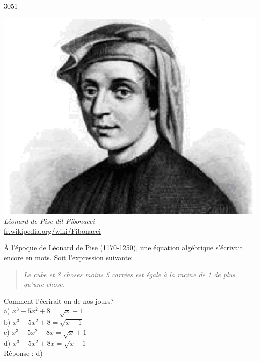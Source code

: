 \documentclass[letterpaper, 12pt]{article}
\begin{document}
3051--
\begin{center}
\includegraphics[scale=0.4]{Fibonacci.eps}\\
\emph{{\small L\'eonard de Pise {\scriptsize dit} Fibonacci}}\\
\href{http://fr.wikipedia.org/wiki/Fibonacci}{fr.wikipedia.org/wiki/Fibonacci}\\
\end{center}

\`A l'\'epoque de L\'eonard de Pise (1170-1250), une \'equation alg\'ebrique s'\'ecrivait encore en mots. Soit l'expression suivante:\\
\begin{quote}
\og \emph{Le cube et 8 choses moins 5 carr\'ees est \'egale \`a la racine de 1 de plus qu'une chose.} \fg\\
\end{quote}
Comment l'\'ecrirait-on de nos jours?\\

a) $x^{3} - 5x^{2} + 8 = \sqrt{x} + 1$\\[2mm]
b) $x^{3} - 5x^{2} + 8 = \sqrt{x + 1}$\\[2mm]
c) $x^{3} - 5x^{2} + 8x = \sqrt{x} + 1$\\[2mm]
d) $x^{3} - 5x^{2} + 8x = \sqrt{x + 1}$\\

R\'eponse : d)\\
\end{document}
